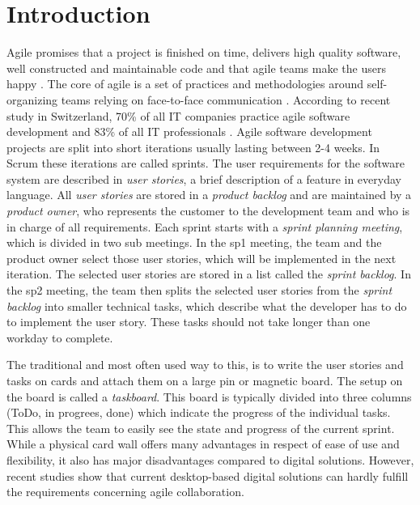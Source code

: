 \documentclass{sigchi}
\begin{document}



\section{Introduction}
Agile promises that a project is finished on time, delivers high quality software, well constructed and maintainable code and that agile teams make the users happy \cite{Stellman:2014}.
The core of agile is a set of practices and methodologies around self-organizing teams relying on face-to-face communication \cite{Cockburn:2001}.
According to recent study in Switzerland, 70\% of all IT companies practice agile software development and 83\% of all IT professionals \cite{Kropp:2015}.
Agile software development projects are split into short iterations usually lasting between 2-4 weeks. In Scrum these iterations are called sprints.
The user requirements for the software system are described in \textit{user stories}, a brief description of a feature in everyday language.
All \textit{user stories} are stored in a \textit{product backlog} and are maintained by a \textit{product owner}, who represents the customer to the development team and who is in charge of all requirements.
Each sprint starts with a \textit{sprint planning meeting}, which is divided in two sub meetings. In the \gls{sp1} meeting, the team and the product owner select those user stories, which will be implemented in the next iteration.
The selected user stories are stored in a list called the \textit{sprint backlog}.
In the \gls{sp2} meeting, the team then splits the selected user stories from the \textit{sprint backlog} into smaller technical tasks, which describe what the developer has to do to implement the user story. These tasks should not take longer than one workday to complete.

The traditional and most often used way to this, is to write the user stories and tasks on cards and attach them on a large pin or magnetic board.
The setup on the board is called a \textit{taskboard}. This board is typically divided into three columns (ToDo, in progrees, done) which indicate the progress of the individual tasks. This allows the team to easily see the state and progress of the current sprint. While a physical card wall offers many advantages in respect of ease of use and flexibility, it also has major disadvantages compared to digital solutions. However, recent studies \cite{udcw:31721, Mateescu:2015} show that current desktop-based digital solutions can hardly fulfill the requirements concerning agile collaboration.
\end{document}
